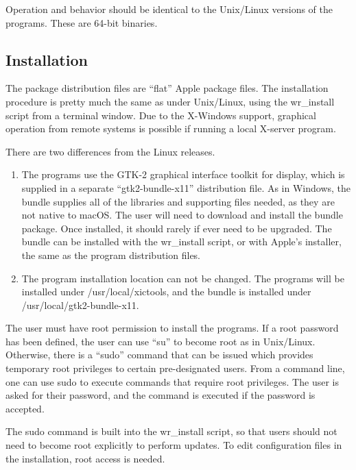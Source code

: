 \begin{itemize}
Operation and behavior should be identical to the Unix/Linux versions
of the programs.  These are 64-bit binaries.

\subsection{Installation}

The package distribution files are ``flat'' Apple package files.  The
installation procedure is pretty much the same as under Unix/Linux,
using the {\vt wr\_install} script from a terminal window.  Due to the
X-Windows support, graphical operation from remote systems is possible
if running a local X-server program.

There are two differences from the Linux releases.
\begin{enumerate}
\item{The programs use the GTK-2 graphical interface toolkit for
display, which is supplied in a separate ``{\vt gtk2-bundle-x11}''
distribution file.  As in Windows, the bundle supplies all of the
libraries and supporting files needed, as they are not native to macOS. 
The user will need to download and install the bundle package.  Once
installed, it should rarely if ever need to be upgraded.  The bundle
can be installed with the {\vt wr\_install} script, or with Apple's
installer, the same as the program distribution files.}

\item{The program installation location can not be changed.  The
programs will be installed under {\vt /usr/local/xictools}, and the
bundle is installed under {\vt /usr/local/gtk2-bundle-x11}.}
\end{enumerate}

The user must have root permission to install the programs.  If a root
password has been defined, the user can use ``{\vt su}'' to become
root as in Unix/Linux.  Otherwise, there is a ``{\vt sudo}'' command
that can be issued which provides temporary root privileges to certain
pre-designated users.  From a command line, one can use {\vt sudo} to
execute commands that require root privileges.  The user is asked for
their password, and the command is executed if the password is
accepted.

The {\vt sudo} command is built into the {\vt wr\_install} script, so
that users should not need to become root explicitly to perform
updates.  To edit configuration files in the installation, root access
is needed.


\end{itemize}
